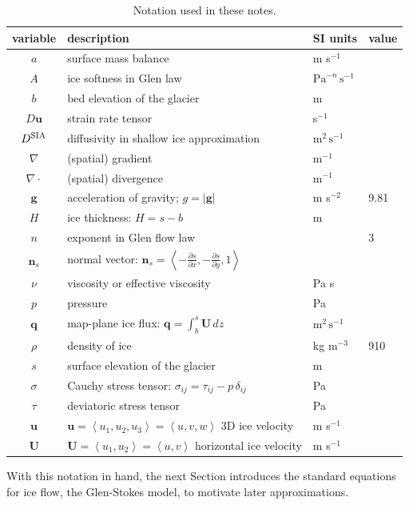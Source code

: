 \documentclass[letterpaper,final,12pt,reqno]{amsart}
\newcommand{\bg}{\mathbf{g}}
\newcommand{\bn}{\mathbf{n}}
\newcommand{\bq}{\mathbf{q}}
\newcommand{\bu}{\mathbf{u}}
\newcommand{\bU}{\mathbf{U}}
\newcommand{\Dsia}{D^{\text{\textrm{SIA}}}}
\begin{document}
\begin{table}[ht]
\caption{Notation used in these notes.}
\begin{tabular}{clll}
variable  & description & SI units & value \\
\hline
$a$           & surface mass balance & m s$^{-1}$ \\
$A$           & ice softness in Glen law & $\text{Pa}^{-n}\,\text{s}^{-1}$ \\
$b$           & bed elevation of the glacier & m \\
$D\bu$        & strain rate tensor & s$^{-1}$ \\
$\Dsia$       & diffusivity in shallow ice approximation \quad & $\text{m}^2\,\text{s}^{-1}$ \\
$\nabla$      & (spatial) gradient & m$^{-1}$ \\
$\nabla\cdot$ & (spatial) divergence & m$^{-1}$ \\
$\bg$         & acceleration of gravity; $g=|\bg|$ & m s$^{-2}$\phantom{foobar} & 9.81 \\
$H$           & ice thickness: $H=s-b$ & m \\
$n$           & exponent in Glen flow law & & 3 \\
$\bn_s$       & normal vector: $\bn_s = \left<-\frac{\partial s}{\partial x},-\frac{\partial s}{\partial y},1\right>$ & \\
$\nu$         & viscosity or effective viscosity & Pa s \\
$p$           & pressure & Pa \\
$\bq$         & map-plane ice flux: $\bq = \int_{b}^{s} \bU\,dz$ & $\text{m}^2\,\text{s}^{-1}$ \\
$\rho$        & density of ice & kg m$^{-3}$ & 910 \\
$s$           & surface elevation of the glacier & m \\
$\sigma$      & Cauchy stress tensor: $\sigma_{ij} = \tau_{ij} - p\, \delta_{ij}$ & Pa \\
$\tau$        & deviatoric stress tensor & Pa \\
$\bu$         & $\bu=\left<u_1,u_2,u_3\right>=\left<u,v,w\right>$ 3D ice velocity & m s$^{-1}$ \\
$\bU$         & $\bU=\left<u_1,u_2\right>=\left<u,v\right>$ horizontal ice velocity & m s$^{-1}$
\end{tabular}
\label{tab:notation}
\end{table}

With this notation in hand, the next Section introduces the standard equations for ice flow, the Glen-Stokes model, to motivate later approximations.
\end{document}
